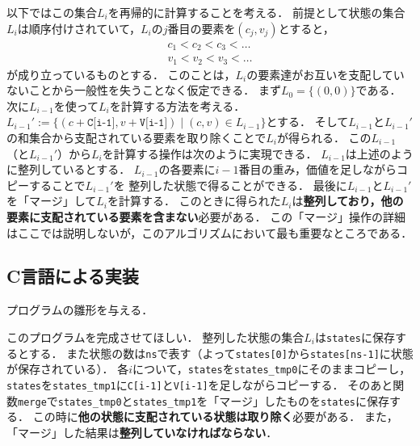 \documentclass[a4paper,twoside,onecolumn,openany,article]{memoir}
\theoremstyle{remark}
\begin{document}
以下ではこの集合$L_i$を再帰的に計算することを考える．
前提として状態の集合$L_i$は順序付けされていて，$L_i$の$j$番目の要素を$(c_j, v_j)$とすると，
\begin{align*}
c_1< c_2< c_3< \dotsc\\
v_1< v_2< v_3< \dotsc
\end{align*}
が成り立っているものとする．
このことは，$L_i$の要素達がお互いを支配していないことから一般性を失うことなく仮定できる．
まず$L_0=\{(0,0)\}$である．
次に$L_{i-1}$を使って$L_i$を計算する方法を考える．
$L_{i-1}':=\{(c+\texttt{C[i-1]}, v+\texttt{V[i-1]})\mid (c,v)\in L_{i-1}\}$とする．
そして$L_{i-1}$と$L_{i-1}'$の和集合から支配されている要素を取り除くことで$L_i$が得られる．
この$L_{i-1}$（と$L_{i-1}'$）から$L_i$を計算する操作は次のように実現できる．
$L_{i-1}$は上述のように整列しているとする．
$L_{i-1}$の各要素に$i-1$番目の重み，価値を足しながらコピーすることで$L_{i-1}'$を
整列した状態で得ることができる．
最後に$L_{i-1}$と$L_{i-1}'$を「マージ」して$L_i$を計算する．
このときに得られた$L_i$は\textbf{整列しており，他の要素に支配されている要素を含まない}必要がある．
この「マージ」操作の詳細はここでは説明しないが，このアルゴリズムにおいて最も重要なところである．

\subsection{C言語による実装}
プログラムの雛形を与える．

このプログラムを完成させてほしい．
整列した状態の集合$L_i$は\texttt{states}に保存するとする．
また状態の数は\texttt{ns}で表す（よって\texttt{states[0]}から\texttt{states[ns-1]}に状態が保存されている）．
各$i$について，\texttt{states}を\texttt{states\_tmp0}にそのままコピーし，
\texttt{states}を\texttt{states\_tmp1}に\texttt{C[i-1]}と\texttt{V[i-1]}を足しながらコピーする．
そのあと関数\texttt{merge}で\texttt{states\_tmp0}と\texttt{states\_tmp1}を「マージ」したものを\texttt{states}に保存する．
この時に\textbf{他の状態に支配されている状態は取り除く}必要がある．
また，「マージ」した結果は\textbf{整列していなければならない}．
\end{document}
